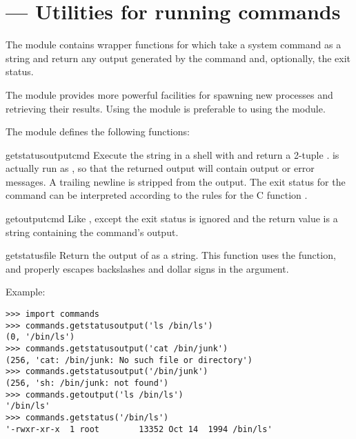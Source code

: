\section{ ---
         Utilities for running commands}



The  module contains wrapper functions for
 which take a system command as a string and
return any output generated by the command and, optionally, the exit
status.

The  module provides more powerful facilities for
spawning new processes and retrieving their results.  Using the
 module is preferable to using the 
module.

The  module defines the following functions:


\begin{funcdesc}{getstatusoutput}{cmd}
Execute the string  in a shell with  and
return a 2-tuple .   is
actually run as , so that the returned
output will contain output or error messages. A trailing newline is
stripped from the output. The exit status for the command can be
interpreted according to the rules for the C function
.
\end{funcdesc}

\begin{funcdesc}{getoutput}{cmd}
Like , except the exit status is ignored
and the return value is a string containing the command's output.  
\end{funcdesc}

\begin{funcdesc}{getstatus}{file}
Return the output of  as a string.  This
function uses the  function, and properly
escapes backslashes and dollar signs in the argument.
\end{funcdesc}

Example:

\begin{verbatim}
>>> import commands
>>> commands.getstatusoutput('ls /bin/ls')
(0, '/bin/ls')
>>> commands.getstatusoutput('cat /bin/junk')
(256, 'cat: /bin/junk: No such file or directory')
>>> commands.getstatusoutput('/bin/junk')
(256, 'sh: /bin/junk: not found')
>>> commands.getoutput('ls /bin/ls')
'/bin/ls'
>>> commands.getstatus('/bin/ls')
'-rwxr-xr-x  1 root        13352 Oct 14  1994 /bin/ls'
\end{verbatim}

\begin{seealso}
\end{seealso}
